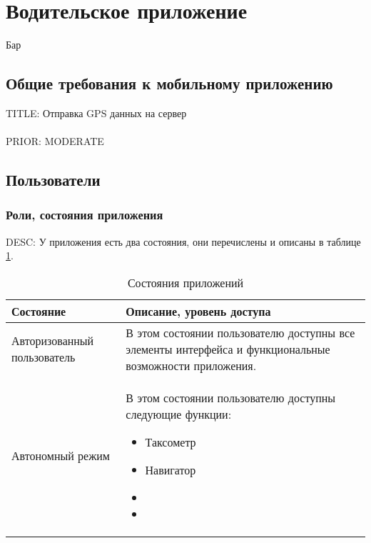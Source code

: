 \section{Водительское приложение}

  Бар

  \subsection{Общие требования к мобильному приложению}

    TITLE: Отправка GPS данных на сервер\\
    \\
    PRIOR: MODERATE\\

  \subsection{Пользователи}

      \subsubsection{Роли, состояния приложения}

      		DESC: У приложения есть два состояния, они перечислены и описаны в таблице \ref{app_state}. 

             \begin{table}
             \begin{center}
             \label{app_state}
             \caption {Состояния приложений}
             \setlength{\extrarowheight}{2mm}
             \begin{tabular}{|p{5cm}|p{10cm}|}
                 \hline     \textbf{Состояние}&\textbf{Описание, уровень доступа} \\ [2mm]

                 \hline   Авторизованный пользователь & В этом состоянии пользователю доступны все элементы интерфейса и функциональные возможности приложения.\\ [2mm]
                 \hline   Автономный режим & В этом состоянии пользователю доступны следующие функции: \begin{itemize} \item Таксометр \item Навигатор \item \item\end{itemize}\\ [2mm]
                  \hline
             \end{tabular}
             \end{center}
             \end{table}

